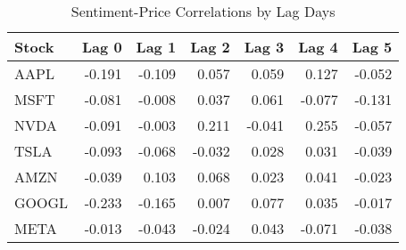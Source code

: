 \begin{table}[h!]
\centering
\caption{Sentiment-Price Correlations by Lag Days}
\label{tab:lag_correlations}
\begin{tabular}{lrrrrrr}
\hline
Stock & Lag 0 & Lag 1 & Lag 2 & Lag 3 & Lag 4 & Lag 5 \\
\hline
AAPL & -0.191 & -0.109 & 0.057 & 0.059 & 0.127 & -0.052 \\
MSFT & -0.081 & -0.008 & 0.037 & 0.061 & -0.077 & -0.131 \\
NVDA & -0.091 & -0.003 & 0.211 & -0.041 & 0.255 & -0.057 \\
TSLA & -0.093 & -0.068 & -0.032 & 0.028 & 0.031 & -0.039 \\
AMZN & -0.039 & 0.103 & 0.068 & 0.023 & 0.041 & -0.023 \\
GOOGL & -0.233 & -0.165 & 0.007 & 0.077 & 0.035 & -0.017 \\
META & -0.013 & -0.043 & -0.024 & 0.043 & -0.071 & -0.038 \\
\hline
\end{tabular}
\end{table}
